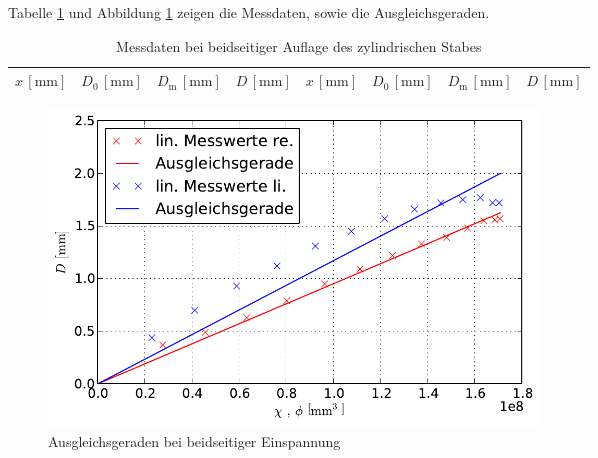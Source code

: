 		Tabelle \ref{table:messung3} und Abbildung \ref{fig:plot3} zeigen die Messdaten, sowie die Ausgleichsgeraden.

		\begin{table}[h!]
			\begin{center}
				\caption{Messdaten bei beidseitiger Auflage des zylindrischen Stabes \label{table:messung3}}
				\begin{tabular}{|r|r|r|r||r|r|r|r|}
					\hline
						\multicolumn{1}{|c|}{$x\,[\mathrm{mm}]$} & 
						\multicolumn{1}{c|}{$D_0\,[\mathrm{mm}]$} & 
						\multicolumn{1}{c|}{$D_\mathrm{m}\,[\mathrm{mm}]$} &
						\multicolumn{1}{c||}{$D\,[\mathrm{mm}]$} & 
						\multicolumn{1}{c|}{$x\,[\mathrm{mm}]$} & 
						\multicolumn{1}{c|}{$D_0\,[\mathrm{mm}]$} & 
						\multicolumn{1}{c|}{$D_\mathrm{m}\,[\mathrm{mm}]$} &
						\multicolumn{1}{c|}{$D\,[\mathrm{mm}]$} \\
					\hline 
					\hline
						
					\hline 
				\end{tabular}
			\end{center}
		\end{table}

		\begin{figure}[h]
			\centering
			\includegraphics[width = 13cm]{img/plot3.pdf}
			\caption{Ausgleichsgeraden bei beidseitiger Einspannung \label{fig:plot3}}
		\end{figure}

		\clearpage